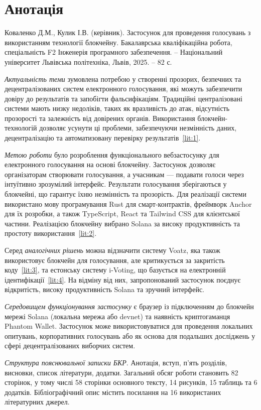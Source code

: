 \documentclass[14pt]{extreport}
\newcommand{\gq}[1]{\guillemotleft{}#1\guillemotright{}}
\newcommand{\plainchap}[1]{
  \chapter*{#1}
}
\begin{document}
  \plainchap{Анотація}
  
  Коваленко Д.М., Кулик І.В. (керівник). Застосунок для проведення голосувань з використанням технології блокчейну. Бакалаврська кваліфікаційна робота, спеціальність F2 \gq{Інженерія програмного забезпечення}. – Національний університет \gq{Львівська політехніка}, Львів, 2025. – 82 с.
  
  \textit{Актуальність теми} зумовлена потребою у створенні прозорих, безпечних та децентралізованих систем електронного голосування, які можуть забезпечити довіру до результатів та запобігти фальсифікаціям. Традиційні централізовані системи мають низку недоліків, таких як вразливість до атак, відсутність прозорості та залежність від довірених органів. Використання блокчейн-технологій дозволяє усунути ці проблеми, забезпечуючи незмінність даних, децентралізацію та автоматизовану перевірку результатів~\ref{lit:1}.

  \textit{Метою роботи} було розроблення функціонального вебзастосунку для електронного голосування на основі блокчейну. Застосунок дозволяє організаторам створювати голосування, а учасникам — подавати голоси через інтуїтивно зрозумілий інтерфейс. Результати голосування зберігаються у блокчейні, що гарантує їхню незмінність та прозорість. Для реалізації системи використано мову програмування Rust для смарт-контрактів, фреймворк Anchor для їх розробки, а також TypeScript, React та Tailwind CSS для клієнтської частини. Реалізацією блокчейну вибрано Solana за високу продуктивність та простоту використання~\ref{lit:2}.

  Серед \textit{аналогічних рішень} можна відзначити систему Voatz, яка також використовує блокчейн для голосування, але критикується за закритість коду~\ref{lit:3}, та естонську систему i-Voting, що базується на електронній ідентифікації~\ref{lit:4}. На відміну від них, запропонований застосунок поєднує відкритість, високу продуктивність Solana та зручний інтерфейс.

  \textit{Середовищем функціонування застосунку} є браузер із підключенням до блокчейн мережі Solana (локальна мережа або devnet) та наявність криптогаманця Phantom Wallet. Застосунок може використовуватися для проведення локальних опитувань, корпоративних голосувань або як основа для подальших досліджень у сфері децентралізованих виборчих систем.

  \textit{Структура пояснювальної записки БКР}. Анотація, вступ, п’ять розділів, висновки, список літератури, додатки. Загальний обсяг роботи становить 82 сторінок, у тому числі 58 сторінки основного тексту, 14 рисунків, 15 таблиць та 6 додатків. Бібліографічний опис містить посилання на 16 використаних літературних джерел.
\end{document}
